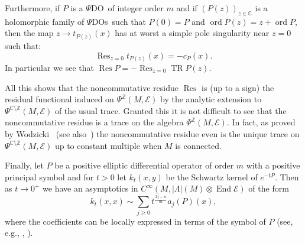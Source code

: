 \documentclass[leqno, 10pt]{amsart}
\theoremstyle{remark}
\begin{document}
Furthermore, if $P$ is a {$\Psi$DO}\ of 
integer order $m$ and if $(P(z))_{z\in {\ensuremath{\mathbb{C}}}}$ is a holomorphic family of {$\Psi$DOs}\ such that $P(0)=P$ and ${{{\operatorname{{ord}}}}} P(z)=z+{{{\operatorname{{ord}}}}} P$, then the map 
$z\rightarrow t_{P(z)}(x)$ has at worst a simple pole singularity near $z=0$ such that: 
\begin{equation}
    {\ensuremath{{\operatorname{{Res}}}}}_{z=0}t_{P(z)}(x)=-c_{P}(x).
     \label{eq:NCR.residue}
\end{equation}
In particular we see that ${\ensuremath{{\operatorname{{Res}}}}} P=-{\ensuremath{{\operatorname{{Res}}}}}_{z=0} {\ensuremath{{\operatorname{{TR}}}}} P(z)$. 

All this shows that the noncommutative residue ${\ensuremath{{\operatorname{{Res}}}}}$ is (up to a sign) 
the residual functional induced on ${\ensuremath{\Psi^{\ensuremath{\mathbb{Z}}}}}(M,{{\ensuremath{\mathcal{{E}}}}})$ by the analytic extension to ${\ensuremath{\Psi^{\ensuremath{\mathbb{C}\!\setminus\!\mathbb{Z}}}}}(M,{{\ensuremath{\mathcal{{E}}}}})$ of the 
usual trace. Granted this it is not difficult  to see that the noncommutative residue is a trace on the algebra ${\ensuremath{\Psi^{\ensuremath{\mathbb{Z}}}}}(M,{{\ensuremath{\mathcal{{E}}}}})$. In fact, as proved by 
Wodzicki~\cite{Wo:PhD} (see also~\cite{Gu:RTCAFIO}) 
the noncommutative residue even is the unique trace on ${\ensuremath{\Psi^{\ensuremath{\mathbb{C}\!\setminus\!\mathbb{Z}}}}}(M,{{\ensuremath{\mathcal{{E}}}}})$ up to constant multiple 
when $M$ is connected. 

Finally, let $P$ be a positive elliptic differential operator of order $m$ with a positive principal symbol and for $t>0$ let $k_{t}(x,y)$ be 
the Schwartz kernel of $e^{-tP}$. Then as $t \rightarrow 0^{+}$ we have an asymptotics in $C^{\infty}(M,|\Lambda|(M)\otimes {\ensuremath{{\operatorname{{End}}}}} {{\ensuremath{\mathcal{{E}}}}})$ of the form 
\begin{equation}
    k_{t}(x,x) \sim \sum_{j \geq 0} t^{\frac{2j-n}{m}}a_{j}(P)(x),
    \label{eq:NCR.heat-kernel-asymptotics}
\end{equation}
where the coefficients can be locally expressed in terms of the symbol of $P$ (see, e.g., \cite{Gr:AEHE}, \cite{Gi:ITHEASIT}). 
\end{document}
